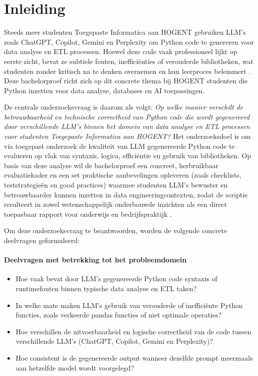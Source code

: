 \documentclass{hogent-article}
\begin{document}
% 

\section{Inleiding}%
\label{sec:inleiding}

Steeds meer studenten Toegepaste Informatica aan HOGENT gebruiken LLM's zoals ChatGPT, Copilot, Gemini en Perplexity om Python code te genereren voor data analyse en ETL processen.  Hoewel deze code vaak professioneel lijkt op eerste zicht, bevat ze subtiele fouten, inefficiënties of verouderde bibliotheken, wat studenten zonder kritisch na te denken overnemen en hun leerproces belemmert \autocite{Zhong2023}. Deze bachelorproef richt zich op dit concrete thema bij HOGENT studenten die Python inzetten voor data analyse, databases en AI toepassingen.

De centrale onderzoeksvraag is daarom als volgt: \textit{Op welke manier verschilt de betrouwbaarheid en technische correctheid van Python code die wordt gegenereerd door verschillende LLM’s binnen het domein van data analyse en ETL processen voor studenten Toegepaste Informatica aan HOGENT?} Het onderzoeksdoel is om via toegepast onderzoek de kwaliteit van LLM gegenereerde Python code te evalueren op vlak van syntaxis, logica, efficiëntie en gebruik van bibliotheken. Op basis van deze analyse wil de bachelorproef een concreet, herbruikbaar evaluatiekader en een set praktische aanbevelingen opleveren (zoals checklists, teststrategieën en good practices) waarmee studenten LLM’s bewuster en betrouwbaarder kunnen inzetten in data engineeringcontexten, zodat de scriptie resulteert in zowel wetenschappelijk onderbouwde inzichten als een direct toepasbaar rapport voor onderwijs en bedrijfspraktijk \autocite{Esfahani2024}. \newpage

Om deze onderzoeksvraag te beantwoorden, worden de volgende concrete deelvragen geformuleerd:

\paragraph{Deelvragen met betrekking tot het \textbf{probleemdomein}}
\begin{itemize}
    \item Hoe vaak bevat door LLM’s gegenereerde Python code syntaxis  of runtimefouten binnen typische data analyse en ETL taken?
    \item In welke mate maken LLM’s gebruik van verouderde of inefficiënte Python functies, zoals verkeerde pandas functies of niet optimale operaties?
    \item Hoe verschillen de uitvoerbaarheid en logische correctheid van de code tussen verschillende LLM’s (ChatGPT, Copilot, Gemini en Perplexity)?
    \item Hoe consistent is de gegenereerde output wanneer dezelfde prompt meermaals aan hetzelfde model wordt voorgelegd?
\end{itemize}
\end{document}
